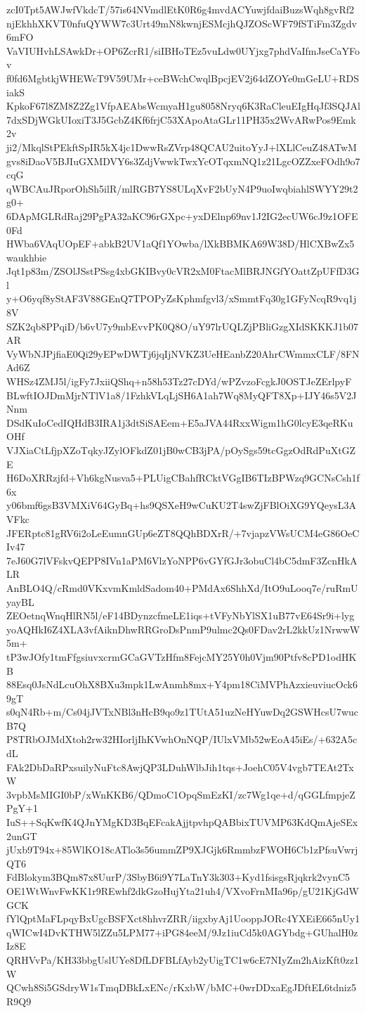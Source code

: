 zcI0Tpt5AWJwfVkdcT/57is64NVmdlEtK0R6g4mvdACYuwjfdaiBuzsWqh8gvRf2
njEkhhXKVT0nfuQYWW7c3Urt49mN8kwnjESMcjhQJZOScWF79fSTiFm3Zgdv6mFO
VaVIUHvhLSAwkDr+OP6ZcrR1/siIBHoTEz5vuLdw0UYjxg7phdVaIfmJseCaYFov
f0fd6MgbtkjWHEWcT9V59UMr+ceBWchCwqlBpcjEV2j64dZOYe0mGeLU+RDSiakS
KpkoF67l8ZM8Z2Zg1VfpAEAbsWcmyaH1gu8058Nryq6K3RaCleuEIgHqJf3SQJAl
7dxSDjWGkUIoxiT3J5GcbZ4Kf6frjC53XApoAtaGLr11PH35x2WvARwPos9Emk2v
ji2/MkqlStPEkftSpIR5kX4jc1DwwRsZVrp48QCAU2uitoYyJ+lXLlCeuZ48ATwM
gvs8iDaoV5BJIuGXMDVY6s3ZdjVwwkTwxYcOTqxmNQ1z21LgcOZZxeFOdh9o7cqG
qWBCAuJRporOhSh5ilR/mlRGB7YS8ULqXvF2bUyN4P9uoIwqbiahlSWYY29t2g0+
6DApMGLRdRaj29PgPA32aKC96rGXpc+yxDElnp69nv1J2IG2ecUW6cJ9z1OFE0Fd
HWba6VAqUOpEF+abkB2UV1aQf1YOwba/lXkBBMKA69W38D/HlCXBwZx5waukhbie
Jqt1p83m/ZSOlJSstPSsg4xbGKIBvy0cVR2xM0FtacMlBRJNGfYOattZpUFfD3Gl
y+O6yqf8yStAF3V88GEnQ7TPOPyZsKphmfgvl3/xSmmtFq30g1GFyNcqR9vq1j8V
SZK2qb8PPqiD/b6vU7y9mbEvvPK0Q8O/uY97lrUQLZjPBliGzgXIdSKKKJ1b07AR
VyWbNJPjfiaE0Qi29yEPwDWTj6jqIjNVKZ3UeHEanbZ20AhrCWmmxCLF/8FNAd6Z
WHSz4ZMJ5l/igFy7JxiiQShq+n58h53Tz27cDYd/wPZvzoFcgkJ0OSTJeZErlpyF
BLwftIOJDmMjrNTlV1a8/1FzhkVLqLjSH6A1ah7Wq8MyQFT8Xp+IJY46s5V2JNnm
DSdKuIoCedIQHdB3IRA1j3dtSiSAEem+E5aJVA44RxxWigm1hG0lcyE3qeRKuOHf
VJXiaCtLfjpXZoTqkyJZylOFkdZ01jB0wCB3jPA/pOySgs59tcGgzOdRdPuXtGZE
H6DoXRRzjfd+Vh6kgNusva5+PLUigCBahfRCktVGgIB6TIzBPWzq9GCNsCsh1f6x
y06bmf6gsB3VMXiV64GyBq+hs9QSXeH9wCuKU2T4swZjFBlOiXG9YQeysL3AVFkc
JFERptc81gRV6i2oLeEumnGUp6eZT8QQhBDXrR/+7vjapzVWsUCM4eG86OeCIv47
7eJ60G7lVFskvQEPP8IVn1aPM6VlzYoNPP6vGYfGJr3obuCl4bC5dmF3ZcnHkALR
AnBLO4Q/cRmd0VKxvmKmldSadom40+PMdAx6ShhXd/ItO9uLooq7e/ruRmUyayBL
ZEOetnqWnqHlRN5l/eF14BDynzcfmeLE1iqs+tVFyNbYlSX1uB77vE64Sr9i+lyg
yoAQHkI6Z4XLA3vfAiknDhwRRGroDsPnmP9ulmc2Qs0FDav2rL2kkUz1NrwwW5m+
tP3wJOfy1tmFfgsiuvxcrmGCaGVTzHfm8FejcMY25Y0h0Vjm90Ptfv8cPD1odHKB
88Esq0JsNdLcuOhX8BXu3mpk1LwAnmh8mx+Y4pm18CiMVPhAzxieuviucOck69gT
s0qN4Rb+m/Cs04jJVTxNBl3nHcB9qo9z1TUtA51uzNeHYuwDq2GSWHcsU7wucB7Q
P8TRbOJMdXtoh2rw32HIorljIhKVwhOnNQP/IUlxVMb52wEoA45iEs/+632A5cdL
FAk2DbDaRPxsuilyNuFtc8AwjQP3LDuhWlbJih1tqs+JoehC05V4vgb7TEAt2TxW
3vpbMsMIGI0bP/xWnKKB6/QDmoC1OpqSmEzKI/zc7Wg1qe+d/qGGLfmpjeZPgY+1
IuS++SqKwfK4QJnYMgKD3BqEFcakAjjtpvhpQABbixTUVMP63KdQmAjeSEx2unGT
jUxb9T94x+85WlKO18cATlo3s56ummZP9XJGjk6RmmbzFWOH6Cb1zPfsuVwrjQT6
FdBlokym3BQm87x8UurP/3SbyB6i9Y7LaTnY3k303+Kyd1fsisgsRjqkrk2vynC5
OE1WtWnvFwKK1r9REwhf2dkGzoHujYta21uh4/VXvoFrnMIa96p/gU21KjGdWGCK
fYlQptMaFLpqyBxUgcBSFXct8hhvrZRR/iigxbyAj1UooppJORc4YXEiE665nUy1
qWICwI4DvKTHW5lZZu5LPM77+iPG84eeM/9Jz1iuCd5k0AGYbdg+GUhalH0zIz8E
QRHVvPa/KH33bbgUslUYe8DfLDFBLfAyb2yUigTC1w6cE7NIyZm2hAizKft0zz1W
QCwh8Si5GSdryW1sTmqDBkLxENc/rKxbW/bMC+0wrDDxaEgJDftEL6tdniz5R9Q9
